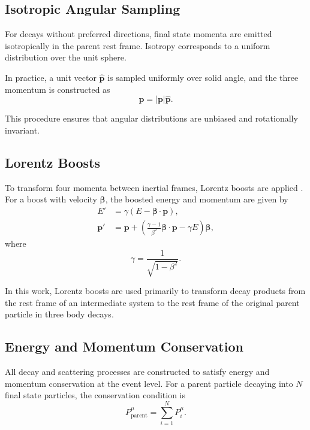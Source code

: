 \documentclass[11pt,a4paper]{article}
\newcommand{\p}{\mathbf{p}}
\begin{document}
\subsection{Isotropic Angular Sampling}

For decays without preferred directions, final state momenta are emitted isotropically
in the parent rest frame. Isotropy corresponds to a uniform distribution over the unit
sphere.

In practice, a unit vector $\hat{\p}$ is sampled uniformly over solid angle, and the
three momentum is constructed as
\begin{equation}
\p = |\p| \hat{\p} .
\end{equation}

This procedure ensures that angular distributions are unbiased and rotationally invariant.

\subsection{Lorentz Boosts}

To transform four momenta between inertial frames, Lorentz boosts are applied \cite{thomson_modern}. For a boost
with velocity $\boldsymbol{\beta}$, the boosted energy and momentum are given by
\begin{align}
E' &= \gamma \left( E - \boldsymbol{\beta} \cdot \p \right), \\
\p' &= \p + \left( \frac{\gamma - 1}{\beta^2} \boldsymbol{\beta} \cdot \p - \gamma E \right)
       \boldsymbol{\beta},
\end{align}
where
\begin{equation}
\gamma = \frac{1}{\sqrt{1 - \beta^2}} .
\end{equation}

In this work, Lorentz boosts are used primarily to transform decay products from the rest
frame of an intermediate system to the rest frame of the original parent particle in
three body decays.

\subsection{Energy and Momentum Conservation}

All decay and scattering processes are constructed to satisfy energy and momentum
conservation at the event level. For a parent particle decaying into $N$ final state
particles, the conservation condition is
\begin{equation}
P_{\text{parent}}^\mu = \sum_{i=1}^N P_i^\mu .
\end{equation}
\end{document}
